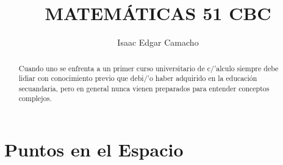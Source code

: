 \documentclass[a4paper,16pt]{article}
\title{MATEM\'ATICAS 51 CBC}
\author{Isaac Edgar Camacho}
\begin{document}
\maketitle

\begin{abstract}
Cuando uno se enfrenta a un primer curso universitario de c/'alculo siempre debe lidiar con conocimiento previo que debi/'o haber adquirido en la educaci\'on secuandaria, pero en general nunca vienen preparados para entender conceptos complejos.

\end{abstract}


\section{Puntos en el Espacio}
\end{document}
